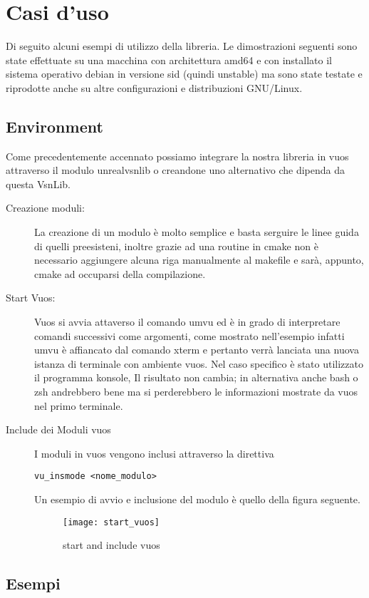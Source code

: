 

\chapter{Casi d'uso}                %
\lhead[\fancyplain{}{\bfseries\thepage}]{\fancyplain{}{\bfseries\rightmark}}
Di seguito alcuni esempi di utilizzo della libreria.
Le dimostrazioni seguenti sono state effettuate su una macchina con architettura amd64 e con installato il sistema operativo debian in versione sid (quindi unstable) ma sono state testate e riprodotte anche su altre configurazioni e distribuzioni GNU/Linux.
\section{Environment}
Come precedentemente accennato possiamo integrare la nostra libreria in vuos attraverso il modulo unrealvsnlib o creandone uno alternativo che dipenda da questa VsnLib.\\
\begin{description}
\item[Creazione moduli:] La creazione di un modulo \`e molto semplice e basta serguire le linee guida di quelli preesisteni, inoltre grazie ad una routine in cmake non \`e necessario aggiungere alcuna riga manualmente al makefile e sar\`a, appunto, cmake ad occuparsi della compilazione.
\item[Start Vuos:] Vuos si avvia attaverso il comando umvu ed \`e in grado di interpretare comandi successivi come argomenti, come mostrato nell'esempio infatti umvu \`e affiancato dal comando xterm e pertanto verr\`a lanciata una nuova istanza di terminale con ambiente vuos. Nel caso specifico \`e stato utilizzato il programma konsole, Il risultato non cambia; in alternativa anche bash o zsh andrebbero bene ma si perderebbero le informazioni mostrate da vuos nel primo terminale.
\item[Include dei Moduli vuos] I moduli in vuos vengono inclusi attraverso la direttiva
\begin{verbatim}
vu_insmode <nome_modulo>
\end{verbatim}
Un esempio di avvio e inclusione del modulo \`e quello della figura seguente.
\begin{figure}[h]                       %
\begin{center}                          %
\texttt{[image: start\_vuos]}%
%
\caption[start/include\_mod vuos]{start and include vuos}\label{fig:map}
\end{center}
\end{figure}
\end{description}
\section{Esempi}                 %

\clearpage{\pagestyle{empty}\cleardoublepage}
